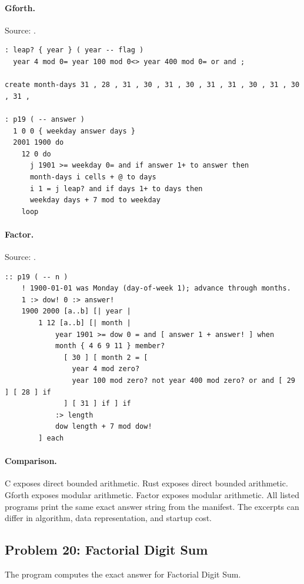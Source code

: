 \paragraph{Gforth.} Source: .
\begin{lstlisting}
: leap? { year } ( year -- flag )
  year 4 mod 0= year 100 mod 0<> year 400 mod 0= or and ;

create month-days 31 , 28 , 31 , 30 , 31 , 30 , 31 , 31 , 30 , 31 , 30 , 31 ,

: p19 ( -- answer )
  1 0 0 { weekday answer days }
  2001 1900 do
    12 0 do
      j 1901 >= weekday 0= and if answer 1+ to answer then
      month-days i cells + @ to days
      i 1 = j leap? and if days 1+ to days then
      weekday days + 7 mod to weekday
    loop
\end{lstlisting}

\paragraph{Factor.} Source: .
\begin{lstlisting}
:: p19 ( -- n )
    ! 1900-01-01 was Monday (day-of-week 1); advance through months.
    1 :> dow! 0 :> answer!
    1900 2000 [a..b] [| year |
        1 12 [a..b] [| month |
            year 1901 >= dow 0 = and [ answer 1 + answer! ] when
            month { 4 6 9 11 } member?
              [ 30 ] [ month 2 = [
                year 4 mod zero?
                year 100 mod zero? not year 400 mod zero? or and [ 29 ] [ 28 ] if
              ] [ 31 ] if ] if
            :> length
            dow length + 7 mod dow!
        ] each
\end{lstlisting}

\paragraph{Comparison.}
C exposes direct bounded arithmetic. Rust exposes direct bounded arithmetic. Gforth exposes modular arithmetic. Factor exposes modular arithmetic.
All listed programs print the same exact answer string from the manifest. The excerpts can differ in algorithm, data representation, and startup cost.

\subsection{Problem 20: Factorial Digit Sum}
\label{walkthrough:p20}
The program computes the exact answer for Factorial Digit Sum.

